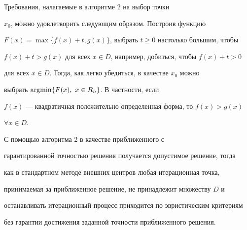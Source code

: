 \begin{note}


Требования, налагаемые в алгоритме 2 на выбор точки


$x_0$, можно удовлетворить следующим образом. Построив фyнкцию


$F(x)=\max\{f(x)+t,g(x)\}$, выбрать $t\ge0$ настолько большим, чтобы


$f(x)+t>g(x)$ для всех $x\in D$, например, добиться, чтобы $f(x)+t>0$


для всех $x\in D$. Тогда, как легко убедиться, в качестве $x_0$ можно


выбрать $\operatorname{argmin}\{F(x),\ x\in R_n\}$. В частности, если


$f(x)$ --- квадратичная положительно определенная форма, то $f(x)>g(x)$\;


$\forall x\in D$.


\end{note}





\begin{note}


С помощью алгоритма 2 в качестве приближенного с


гарантированной точностью решения получается допустимое решение, тогда


как в стандартном методе внешних центров любая итерационная точка,


принимаемая за приближенное решение, не принадлежит множеству $D$ и


останавливать итерационный процесс приходится по эвристическим критериям


без гарантии достижения заданной точности приближенного решения.


\end{note}








